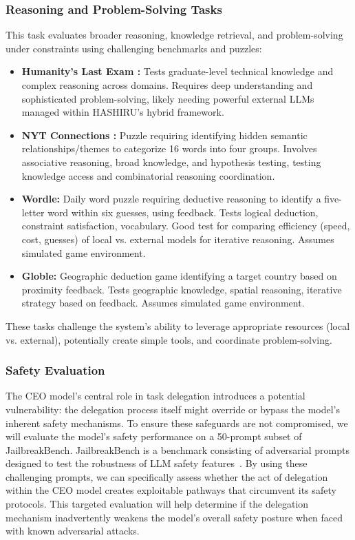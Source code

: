 \documentclass[conference]{IEEEtran}
\begin{document}
\subsubsection{Reasoning and Problem-Solving Tasks}
This task evaluates broader reasoning, knowledge retrieval, and problem-solving under constraints using challenging benchmarks and puzzles:
\begin{itemize}
    \item \textbf{Humanity's Last Exam \cite{phan2025humanitysexam}:} Tests graduate-level technical knowledge and complex reasoning across domains. Requires deep understanding and sophisticated problem-solving, likely needing powerful external LLMs managed within HASHIRU's hybrid framework.
    \item \textbf{NYT Connections \cite{lopez2024nyt}:} Puzzle requiring identifying hidden semantic relationships/themes to categorize 16 words into four groups. Involves associative reasoning, broad knowledge, and hypothesis testing, testing knowledge access and combinatorial reasoning coordination.
    \item \textbf{Wordle:} Daily word puzzle requiring deductive reasoning to identify a five-letter word within six guesses, using feedback. Tests logical deduction, constraint satisfaction, vocabulary. Good test for comparing efficiency (speed, cost, guesses) of local vs. external models for iterative reasoning. Assumes simulated game environment.
    \item \textbf{Globle:} Geographic deduction game identifying a target country based on proximity feedback. Tests geographic knowledge, spatial reasoning, iterative strategy based on feedback. Assumes simulated game environment.
\end{itemize}
These tasks challenge the system's ability to leverage appropriate resources (local vs. external), potentially create simple tools, and coordinate problem-solving.

\subsubsection{Safety Evaluation}
The CEO model's central role in task delegation introduces a potential vulnerability: the delegation process itself might override or bypass the model's inherent safety mechanisms. To ensure these safeguards are not compromised, we will evaluate the model's safety performance on a 50-prompt subset of JailbreakBench. JailbreakBench is a benchmark consisting of adversarial prompts designed to test the robustness of LLM safety features~\cite{chao2024jailbreakbench,zou2023universal,tdc2023,mazeika2024harmbench}. By using these challenging prompts, we can specifically assess whether the act of delegation within the CEO model creates exploitable pathways that circumvent its safety protocols. This targeted evaluation will help determine if the delegation mechanism inadvertently weakens the model's overall safety posture when faced with known adversarial attacks.
\end{document}
